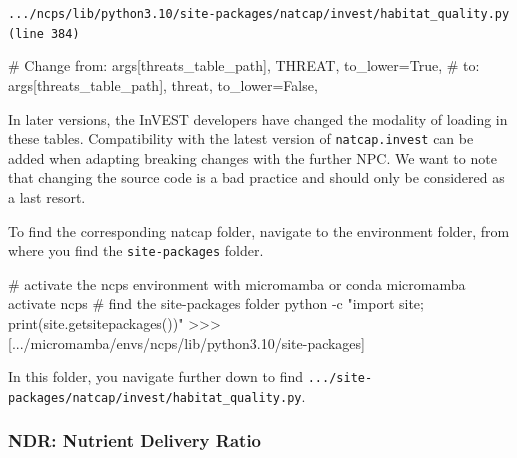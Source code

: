 \documentclass[
  letterpaper,
  DIV=11,
  numbers=noendperiod]{scrreprt}
\newenvironment{Shaded}{\begin{snugshade}}{\end{snugshade}}
\newcommand{\AttributeTok}[1]{\textcolor[rgb]{0.40,0.45,0.13}{#1}}
\newcommand{\CommentTok}[1]{\textcolor[rgb]{0.37,0.37,0.37}{#1}}
\newcommand{\ExtensionTok}[1]{\textcolor[rgb]{0.00,0.23,0.31}{#1}}
\newcommand{\NormalTok}[1]{\textcolor[rgb]{0.00,0.23,0.31}{#1}}
\newcommand{\OperatorTok}[1]{\textcolor[rgb]{0.37,0.37,0.37}{#1}}
\newcommand{\StringTok}[1]{\textcolor[rgb]{0.13,0.47,0.30}{#1}}
\newcommand{\VariableTok}[1]{\textcolor[rgb]{0.07,0.07,0.07}{#1}}
\begin{document}
\begin{codelisting}

\caption{\texttt{.../ncps/lib/python3.10/site-packages/natcap/invest/habitat\_quality.py
(line 384)}}

\begin{Shaded}
\begin{Highlighting}[]
\CommentTok{\# Change from:}
\NormalTok{            args[}\StringTok{\textquotesingle{}threats\_table\_path\textquotesingle{}}\NormalTok{], }\StringTok{\textquotesingle{}THREAT\textquotesingle{}}\NormalTok{, to\_lower}\OperatorTok{=}\VariableTok{True}\NormalTok{,}
\CommentTok{\# to:}
\NormalTok{            args[}\StringTok{\textquotesingle{}threats\_table\_path\textquotesingle{}}\NormalTok{], }\StringTok{\textquotesingle{}threat\textquotesingle{}}\NormalTok{, to\_lower}\OperatorTok{=}\VariableTok{False}\NormalTok{,}
\end{Highlighting}
\end{Shaded}

\end{codelisting}

In later versions, the InVEST developers have changed the modality of
loading in these tables. Compatibility with the latest version of
\texttt{natcap.invest} can be added when adapting breaking changes with
the further NPC. We want to note that changing the source code is a bad
practice and should only be considered as a last resort.

To find the corresponding natcap folder, navigate to the environment
folder, from where you find the \texttt{site-packages} folder.

\begin{Shaded}
\begin{Highlighting}[]
\CommentTok{\# activate the ncps environment with micromamba or conda}
\ExtensionTok{micromamba}\NormalTok{ activate ncps}
\CommentTok{\# find the site{-}packages folder}
\ExtensionTok{python} \AttributeTok{{-}c} \StringTok{"import site; print(site.getsitepackages())"}
\OperatorTok{\textgreater{}\textgreater{}\textgreater{}} \ExtensionTok{[}\StringTok{\textquotesingle{}.../micromamba/envs/ncps/lib/python3.10/site{-}packages\textquotesingle{}}\ExtensionTok{]}
\end{Highlighting}
\end{Shaded}

In this folder, you navigate further down to find
\texttt{.../site-packages/natcap/invest/habitat\_quality.py}.

\subsubsection{NDR: Nutrient Delivery Ratio}\label{NDR}
\end{document}
